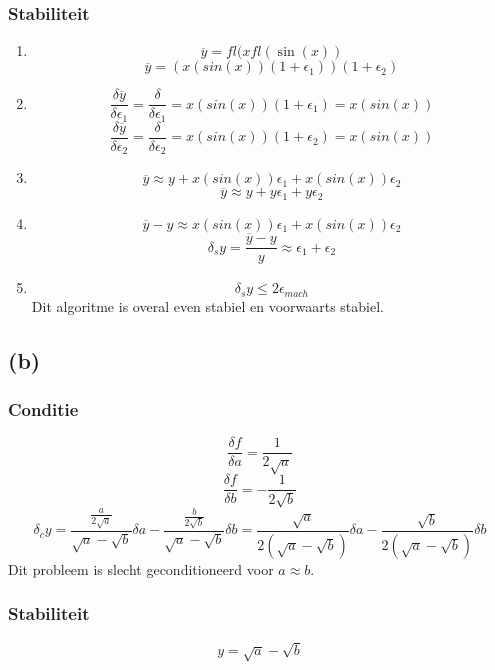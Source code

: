 \documentclass[12pt,a4paper]{article}
\begin{document}
\subsubsection*{Stabiliteit}
\begin{enumerate}
\item
\[
\overline{y} = fl(xfl(\sin(x))
\]
\[
\overline{y} = (x(sin(x))(1+\epsilon_1))(1+\epsilon_2)
\]

\item 
\[
\frac{\delta\overline{y}}{\delta\epsilon_1} = \frac{\delta}{\delta\epsilon_1}
= x(sin(x))(1+\epsilon_1)
= x(sin(x))
\]
\[
\frac{\delta\overline{y}}{\delta\epsilon_2} = \frac{\delta}{\delta\epsilon_2}
= x(sin(x))(1+\epsilon_2)
= x(sin(x))
\]

\item 
\[
\overline{y} \approx y
+ x(sin(x))\epsilon_1
+ x(sin(x))\epsilon_2
\]
\[
\overline{y} \approx y
+ y\epsilon_1
+ y\epsilon_2
\]

\item
\[
\overline{y}-y \approx
  x(sin(x))\epsilon_1
+ x(sin(x))\epsilon_2
\]
\[
\delta_sy=
\frac{\overline{y}-y}{y} \approx
 \epsilon_1
+\epsilon_2
\] 

\item
\[
\delta_sy \le 2\epsilon_{mach}
\]
Dit algoritme is overal even stabiel en voorwaarts stabiel.
\end{enumerate}

\subsection*{(b)}
\subsubsection*{Conditie}
\[
\frac{\delta f}{\delta a} = \frac{1}{2\sqrt{a}}
\]
\[
\frac{\delta f}{\delta b} = -\frac{1}{2\sqrt{b}}
\]
\[
\delta_cy
= \frac{\frac{a}{2\sqrt{a}}}{\sqrt{a}-\sqrt{b}}\delta a
- \frac{\frac{b}{2\sqrt{b}}}{\sqrt{a}-\sqrt{b}}\delta b
=\frac{\sqrt{a}}{2(\sqrt{a}-\sqrt{b})}\delta a
- \frac{\sqrt{b}}{2(\sqrt{a}-\sqrt{b})}\delta b
\]
Dit probleem is slecht geconditioneerd voor $a \approx b$.

\subsubsection*{Stabiliteit}
\[
y = \sqrt{a}-\sqrt{b}
\]
\end{document}

